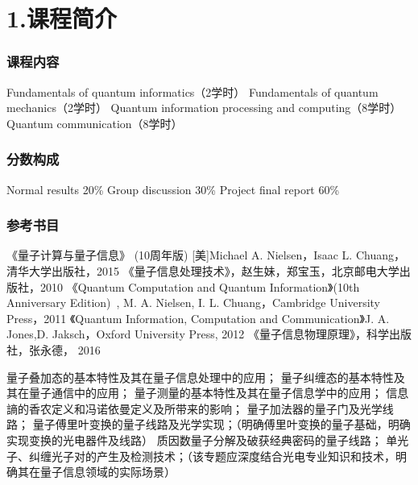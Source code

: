 
\section{1.课程简介}

\begin{frame}
    \frametitle{课程内容}
        \begin{enumerate}
            \Item Fundamentals of quantum informatics（2学时）
            \IItem Fundamentals of quantum mechanics（2学时）
            \Item Quantum information processing and computing（8学时）
            \Item Quantum communication（8学时）
        \end{enumerate}
\end{frame}
\begin{frame} 
    \frametitle{分数构成}
        \begin{enumerate}
            \Item Normal results 20\%
            \Item Group discussion 30\%
            \Item Project final report 60\%
        \end{enumerate}
\end{frame}

\begin{frame}
    \frametitle{参考书目}
        \begin{itemize}
            \Item 《量子计算与量子信息》 (10周年版)  [美]Michael A. Nielsen，Isaac L. Chuang，清华大学出版社，2015        
            \Item 《量子信息处理技术》，赵生妹，郑宝玉，北京邮电大学出版社，2010
            \Item 《Quantum Computation and Quantum Information》(10th Anniversary Edition) , M. A. Nielsen, I. L. Chuang，Cambridge University Press，2011
            \Item 《Quantum Information, Computation and Communication》J. A. Jones,D. Jaksch，Oxford  University Press, 2012
            \Item 《量子信息物理原理》，科学出版社，张永德，   2016
        \end{itemize}
\end{frame}

\begin{frame}
    \begin{tcolorbox4}[分组讨论及报告专题设置(1)]    
        \begin{enumerate}
            \Item   量子叠加态的基本特性及其在量子信息处理中的应用；
            \Item   量子纠缠态的基本特性及其在量子通信中的应用；
            \Item  量子测量的基本特性及其在量子信息学中的应用；
            \Item  信息謪的香农定义和冯诺依曼定义及所带来的影响；
            \Item  量子加法器的量子门及光学线路；
            \Item  量子傅里叶变换的量子线路及光学实现；（明确傅里叶变换的量子基础，明确实现变换的光电器件及线路）
            \Item  质因数量子分解及破获经典密码的量子线路； 
            \Item   单光子、纠缠光子对的产生及检测技术；（该专题应深度结合光电专业知识和技术，明确其在量子信息领域的实际场景） 
        \end{enumerate}
    \end{tcolorbox4} 
\end{frame}

